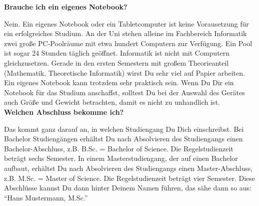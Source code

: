 {    \textbf{Brauche ich ein eigenes Notebook?}

    Nein. Ein eigenes Notebook oder ein Tabletcomputer ist keine Vorausetzung für ein erfolgreiches Studium. An der Uni stehen alleine im Fachbereich Informatik zwei große PC-Poolräume mit etwa hundert Computern zur Verfügung. Ein Pool ist sogar 24 Stunden täglich geöffnet. Informatik ist nicht mit Computern gleichzusetzen. Gerade in den ersten Semestern mit großem Theorieanteil (Mathematik, Theoretische Informatik) wirst Du sehr viel auf Papier arbeiten. Ein eigenes Notebook kann trotzdem sehr praktisch sein. Wenn Du Dir ein Notebook für das Studium anschaffst, solltest Du bei der Auswahl des Gerätes auch Größe und Gewicht betrachten, damit es nicht zu unhandlich ist.\\

    \textbf{Welchen Abschluss bekomme ich?}

    Das kommt ganz darauf an, in welchen Studiengang Du Dich einschreibst. Bei Bachelor Studiengängen erhältst Du nach Absolvieren des Studiengangs einen Bachelor-Abschluss, z.B. B.Sc. = Bachelor of Science. Die Regelstudienzeit beträgt sechs Semester.
    In einem Masterstudiengang, der auf einen Bachelor aufbaut, erhältst Du nach Absolvieren des Studiengangs einen Master-Abschluss, z.B. M.Sc. = Master of Science. Die Regelstudienzeit beträgt vier Semester.
    Diese Abschlüsse kannst Du dann hinter Deinem Namen führen, das sähe dann so aus:\\ "`Hans Mustermann, M.Sc."'


}{}
\newpage
